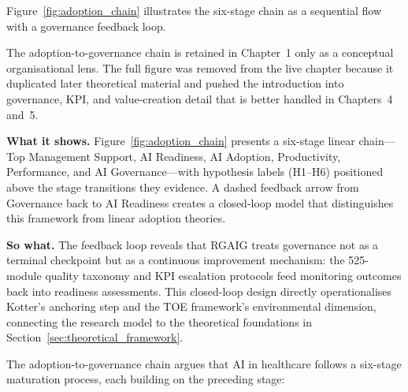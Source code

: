 Figure~\ref{fig:adoption_chain} illustrates the six-stage chain as a sequential flow with a governance feedback loop.


\label{fig:adoption_chain}

\noindent The adoption-to-governance chain is retained in Chapter~1 only as a conceptual organisational lens. The full figure was removed from the live chapter because it duplicated later theoretical material and pushed the introduction into governance, KPI, and value-creation detail that is better handled in Chapters~4 and~5.

\iffalse %

\noindent\textbf{What it shows.} Figure~\ref{fig:adoption_chain} presents a six-stage linear chain---Top Management Support, AI Readiness, AI Adoption, Productivity, Performance, and AI Governance---with hypothesis labels (H1--H6) positioned above the stage transitions they evidence. A dashed feedback arrow from Governance back to AI Readiness creates a closed-loop model that distinguishes this framework from linear adoption theories.


\noindent\textbf{So what.} The feedback loop reveals that RGAIG treats governance not as a terminal checkpoint but as a continuous improvement mechanism: the 525-module quality taxonomy and KPI escalation protocols feed monitoring outcomes back into readiness assessments. This closed-loop design directly operationalises Kotter's anchoring step and the TOE framework's environmental dimension, connecting the research model to the theoretical foundations in Section~\ref{sec:theoretical_framework}.

The adoption-to-governance chain argues that AI in healthcare follows a six-stage maturation process, each building on the preceding stage:

